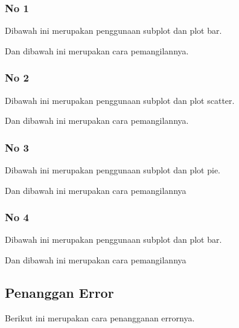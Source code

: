 \subsubsection{No 1}
\hfill \break
Dibawah ini merupakan penggunaan subplot dan plot bar.

Dan dibawah ini merupakan cara pemangilannya.



\subsubsection{No 2}

\hfill \break

Dibawah ini merupakan penggunaan subplot dan plot scatter.

Dan dibawah ini merupakan cara pemangilannya.



\subsubsection{No 3}

\hfill \break

Dibawah ini merupakan penggunaan subplot dan plot pie.

Dan dibawah ini merupakan cara pemangilannya



\subsubsection{No 4}

\hfill \break

Dibawah ini merupakan penggunaan subplot dan plot bar.

Dan dibawah ini merupakan cara pemangilannya



\subsection{Penanggan Error}

\hfill \break

Berikut ini merupakan cara penangganan errornya.
